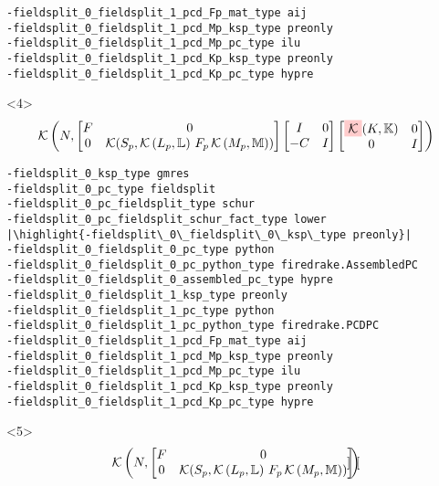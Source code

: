 \documentclass[presentation]{beamer}
\newcommand{\KSP}[2]{\ensuremath{\mathcal{K}\left(#1, \mathbb{#2}\right)}}
\newcommand{\highlight}[1]{\colorbox{red!20}{\color{black} #1}}
\begin{document}
\begin{frame}[fragile]
\begin{onlyenv}
\begin{verbatim}
-fieldsplit_0_fieldsplit_1_pcd_Fp_mat_type aij
-fieldsplit_0_fieldsplit_1_pcd_Mp_ksp_type preonly
-fieldsplit_0_fieldsplit_1_pcd_Mp_pc_type ilu
-fieldsplit_0_fieldsplit_1_pcd_Kp_ksp_type preonly
-fieldsplit_0_fieldsplit_1_pcd_Kp_pc_type hypre
\end{verbatim}
  \end{onlyenv}
  \begin{onlyenv}<4>
    \color{gray}
    \begin{equation*}
      \KSP{N}{%
        \begin{bmatrix}
        F & 0 \\
        0 & \mathcal{K}(S_p, \KSP{L_p}{L}\,F_p \, \KSP{M_p}{M})
      \end{bmatrix}
      \begin{bmatrix}
        I & 0\\
        -C & I
      \end{bmatrix}
      \begin{bmatrix}
        \highlight{$\mathcal{K}$}(K, \mathbb{K}) & 0 \\
        0 & I
      \end{bmatrix}}
    \end{equation*}
\begin{verbatim}
-fieldsplit_0_ksp_type gmres
-fieldsplit_0_pc_type fieldsplit
-fieldsplit_0_pc_fieldsplit_type schur
-fieldsplit_0_pc_fieldsplit_schur_fact_type lower
|\highlight{-fieldsplit\_0\_fieldsplit\_0\_ksp\_type preonly}|
-fieldsplit_0_fieldsplit_0_pc_type python
-fieldsplit_0_fieldsplit_0_pc_python_type firedrake.AssembledPC
-fieldsplit_0_fieldsplit_0_assembled_pc_type hypre
-fieldsplit_0_fieldsplit_1_ksp_type preonly
-fieldsplit_0_fieldsplit_1_pc_type python
-fieldsplit_0_fieldsplit_1_pc_python_type firedrake.PCDPC
-fieldsplit_0_fieldsplit_1_pcd_Fp_mat_type aij
-fieldsplit_0_fieldsplit_1_pcd_Mp_ksp_type preonly
-fieldsplit_0_fieldsplit_1_pcd_Mp_pc_type ilu
-fieldsplit_0_fieldsplit_1_pcd_Kp_ksp_type preonly
-fieldsplit_0_fieldsplit_1_pcd_Kp_pc_type hypre
\end{verbatim}
  \end{onlyenv}
  \begin{onlyenv}<5>
    \color{gray}
    \begin{equation*}
      \KSP{N}{%
        \begin{bmatrix}
        F & 0 \\
        0 & \mathcal{K}(S_p, \KSP{L_p}{L}\,F_p \, \KSP{M_p}{M})
      \end{bmatrix}
      \begin{bmatrix}

\end{bmatrix}}
\end{equation*}
\end{onlyenv}
\end{frame}
\end{document}
